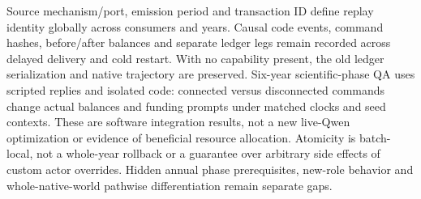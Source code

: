 Source mechanism/port, emission period and transaction ID define replay
identity globally across consumers and years. Causal code events, command
hashes, before/after balances and separate ledger legs remain recorded across
delayed delivery and cold restart. With no capability present, the old ledger
serialization and native trajectory are preserved. Six-year scientific-phase
QA uses scripted replies and isolated code: connected versus disconnected
commands change actual balances and funding prompts under matched clocks and
seed contexts. These are software integration results, not a new live-Qwen
optimization or evidence of beneficial resource allocation. Atomicity is
batch-local, not a whole-year rollback or a guarantee over arbitrary side
effects of custom actor overrides. Hidden annual phase prerequisites, new-role
behavior and whole-native-world pathwise differentiation remain separate gaps.
